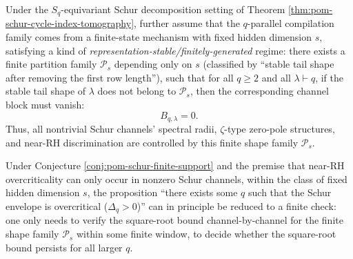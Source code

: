\begin{conjecture}\label{conj:pom-schur-finite-support}
Under the \(S_q\)-equivariant Schur decomposition setting of Theorem \ref{thm:pom-schur-cycle-index-tomography},
further assume that the \(q\)-parallel compilation family comes from a finite-state mechanism with fixed hidden dimension \(s\), satisfying a kind of \emph{representation-stable/finitely-generated} regime:
there exists a finite partition family \(\mathcal{P}_s\) depending only on \(s\) (classified by ``stable tail shape after removing the first row length''), such that for all \(q\ge2\) and all \(\lambda\vdash q\), if the stable tail shape of \(\lambda\) does not belong to \(\mathcal{P}_s\), then the corresponding channel block must vanish:
\[
B_{q,\lambda}=0.
\]
Thus, all nontrivial Schur channels' spectral radii, \(\zeta\)-type zero-pole structures, and near-RH discrimination are controlled by this finite shape family \(\mathcal{P}_s\).
\end{conjecture}

\begin{corollary}\label{cor:pom-schur-near-rh-finite-check}
Under Conjecture \ref{conj:pom-schur-finite-support} and the premise that near-RH overcriticality can only occur in nonzero Schur channels,
within the class of fixed hidden dimension \(s\), the proposition ``there exists some \(q\) such that the Schur envelope is overcritical (\(\Delta_q>0\))'' can in principle be reduced to a finite check:
one only needs to verify the square-root bound channel-by-channel for the finite shape family \(\mathcal{P}_s\) within some finite window, to decide whether the square-root bound persists for all larger \(q\).
\end{corollary}

